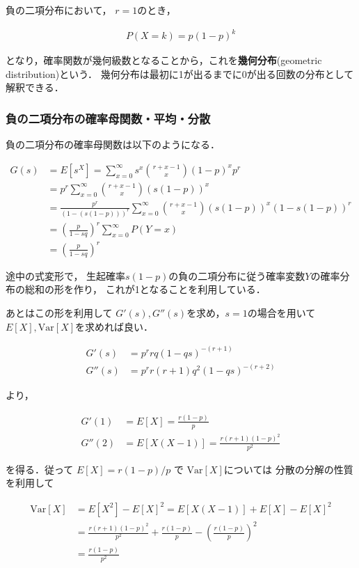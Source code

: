 \documentclass[12pt,a4j,draft]{jarticle}
\numberwithin{equation}{section}
\theoremstyle{break}
\newcommand{\V}{\text{Var}}
\begin{document}
負の二項分布において， $r=1$のとき，

\begin{align}
    \label{eq:def-pf-of-geo}
    P(X=k) = p(1-p)^k
\end{align}

となり，確率関数が幾何級数となることから，これを\textbf{幾何分布}(geometric distribution)という．
幾何分布は最初に1が出るまでに0が出る回数の分布として解釈できる．

\subsubsection{負の二項分布の確率母関数・平均・分散}

負の二項分布の確率母関数は以下のようになる． 

\begin{align}
    G(s) &= E[s^X] = \sum_{x=0}^{\infty} s^x \binom{r+x-1}{x} (1-p)^x p^r \\
    &= p^r \sum_{x=0}^{\infty} \binom{r+x-1}{x} (s(1-p))^x \\
    &= \frac{p^r}{(1 - (s(1-p)))^r} \sum_{x=0}^{\infty} \binom{r+x-1}{x} (s(1-p))^x (1 - s(1-p))^r \\
    &= \left( \frac{p}{1-sq} \right)^r \sum_{x=0}^{\infty} P(Y=x) \\
    &= \left( \frac{p}{1-sq} \right)^r
\end{align}

途中の式変形で， 生起確率$s(1-p)$の負の二項分布に従う確率変数$Y$の確率分布の総和の形を作り， これが1となることを利用している．

あとはこの形を利用して $G'(s), G''(s)$を求め，$s=1$の場合を用いて $E[X], \V[X]$を求めれば良い． 

\begin{align}
    G'(s)  &= p^r rq (1 - qs)^{-(r+1)} \\
    G''(s) &= p^r r (r + 1) q^2 (1 - qs)^{-(r+2)}
\end{align}

より，

\begin{align}
    G'(1)  &= E[X] = \frac{r(1-p)}{p} \\
    G''(2) &= E[X(X-1)] = \frac{r(r+1)(1-p)^2}{p^2}
\end{align}

を得る．従って $E[X] = r(1-p) / p$ で $\V[X]$については 分散の分解の性質を利用して

\begin{align}
    \V[X] &= E[X^2] - E[X]^2 = E[X(X-1)] + E[X] - E[X]^2 \\
    &= \frac{r(r+1)(1-p)^2}{p^2} + \frac{r(1-p)}{p} - \left( \frac{r(1-p)}{p} \right)^2 \\
    &= \frac{r(1-p)}{p^2}
\end{align}
\end{document}
